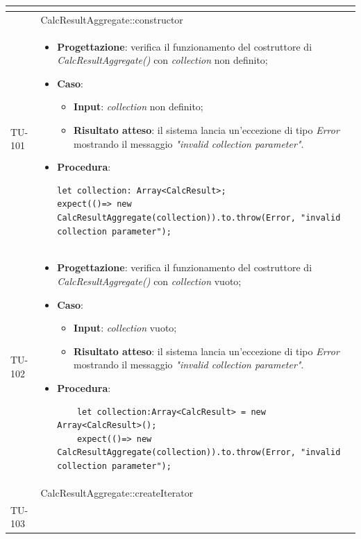 \begin{longtable}{|C{1.5cm}|C{14.5cm}|}
\begin{itemize}
\end{itemize}\\
\hline
{} & CalcResultAggregate::constructor
\\ \hline
{TU-101} &
\begin{itemize}
	\item \textbf{Progettazione}: verifica il funzionamento del costruttore di \emph{CalcResultAggregate()} con \emph{collection} non definito;
	\item \textbf{Caso}: 
	\begin{itemize}
		\item \textbf{Input}: \emph{collection} non definito;
		\item \textbf{Risultato atteso}: il sistema lancia un'eccezione di tipo \emph{Error} mostrando il messaggio \emph{"invalid collection parameter"}.
	\end{itemize}
	\item \textbf{Procedura}:
	\begin{lstlisting}
let collection: Array<CalcResult>;
expect(()=> new CalcResultAggregate(collection)).to.throw(Error, "invalid collection parameter");
	\end{lstlisting}
\end{itemize}\\
\hline
{TU-102} &
\begin{itemize}
	\item \textbf{Progettazione}: verifica il funzionamento del costruttore di \emph{CalcResultAggregate()} con \emph{collection} vuoto;
	\item \textbf{Caso}: 
	\begin{itemize}
		\item \textbf{Input}: \emph{collection} vuoto;
		\item \textbf{Risultato atteso}: il sistema lancia un'eccezione di tipo \emph{Error} mostrando il messaggio \emph{"invalid collection parameter"}.
	\end{itemize}
	\item \textbf{Procedura}:
	\begin{lstlisting}
	let collection:Array<CalcResult> = new Array<CalcResult>();
	expect(()=> new CalcResultAggregate(collection)).to.throw(Error, "invalid collection parameter");
	\end{lstlisting}
\end{itemize}\\
\hline
{} & CalcResultAggregate::createIterator
\\ \hline
{TU-103} &

\end{longtable}
